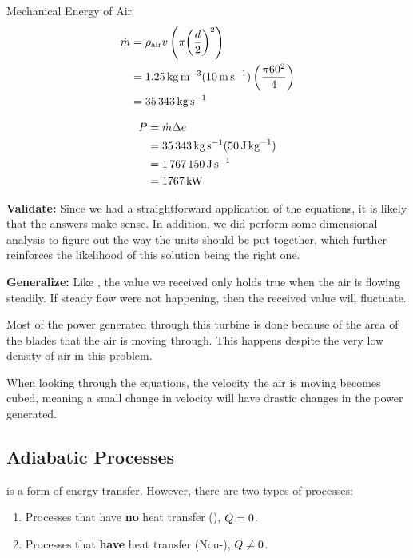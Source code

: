 \begin{example}{Mechanical Energy of Air}
  \begin{align*}
    \dot{m} &= \rho_{\mathrm{air}} v \left( \pi {\left( \frac{d}{2} \right)}^{2} \right) \\
                     &= \SI{1.25}{\kilo\gram\per\cubic\meter} (\SI{10}{\meter\per\second}) \left( \frac{\pi 60^{2}}{4} \right) \\
                     &= \SI{35343}{\kilo\gram\per\second}
  \end{align*}

  \begin{align*}
    P &= \dot{m} \Delta e \\
           &= \SI{35343}{\kilo\gram\per\second} (\SI{50}{\joule\per\kilo\gram}) \\
           &= \SI{1767150}{\joule\per\second} \\
           &= \SI{1767}{\kilo\watt}
  \end{align*}

  \textbf{Validate:}
  Since we had a straightforward application of the equations, it is likely that the answers make sense.
  In addition, we did perform some dimensional analysis to figure out the way the units should be put together, which further reinforces the likelihood of this solution being the right one.

  \textbf{Generalize:}
  Like , the value we received only holds true when the air is flowing steadily.
  If steady flow were not happening, then the received value will fluctuate.

  Most of the power generated through this turbine is done because of the area of the blades that the air is moving through.
  This happens despite the very low density of air in this problem.

  When looking through the equations, the velocity the air is moving becomes cubed, meaning a small change in velocity will have drastic changes in the power generated.
\end{example}

\subsection{Adiabatic Processes}\label{subsec:Adiabatic_Processes}
 is a form of energy transfer.
However, there are two types of processes:
\begin{enumerate}[noitemsep]
\item Processes that have \textbf{no} heat transfer (), $Q = 0$.
\item Processes that \textbf{have} heat transfer (Non-), $Q \neq 0$.
\end{enumerate}

